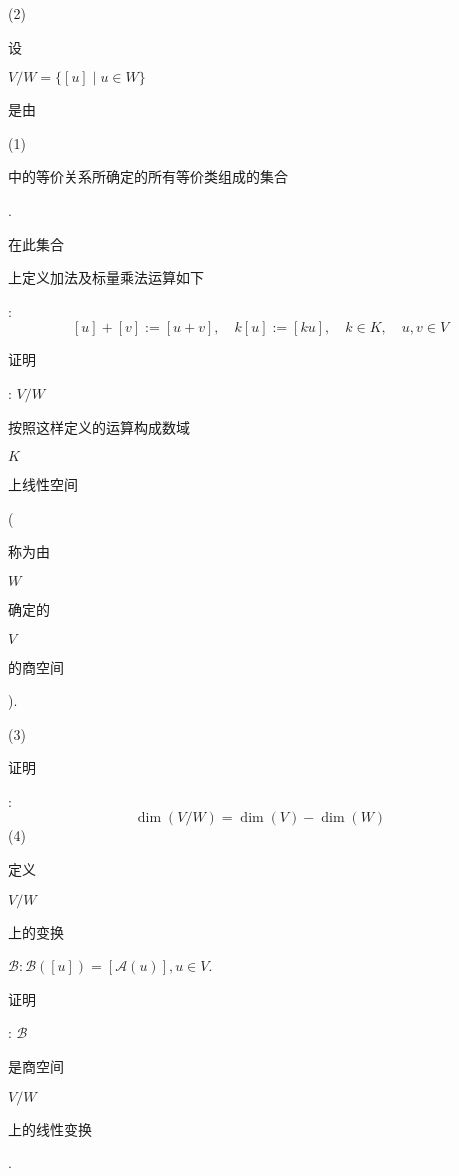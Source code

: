 \documentclass[10pt]{article}
\begin{document}
(2) \begin{CJK}{UTF8}{mj}设\end{CJK} $V / W=\{[u] \mid u \in W\}$ \begin{CJK}{UTF8}{mj}是由\end{CJK} (1) \begin{CJK}{UTF8}{mj}中的等价关系所确定的所有等价类组成的集合\end{CJK}. \begin{CJK}{UTF8}{mj}在此集合\end{CJK} \begin{CJK}{UTF8}{mj}上定义加法及标量乘法运算如下\end{CJK}:
$$
[u]+[v]:=[u+v], \quad k[u]:=[k u], \quad k \in K, \quad u, v \in V
$$
\begin{CJK}{UTF8}{mj}证明\end{CJK}: $V / W$ \begin{CJK}{UTF8}{mj}按照这样定义的运算构成数域\end{CJK} $K$ \begin{CJK}{UTF8}{mj}上线性空间\end{CJK} (\begin{CJK}{UTF8}{mj}称为由\end{CJK} $W$ \begin{CJK}{UTF8}{mj}确定的\end{CJK} $V$ \begin{CJK}{UTF8}{mj}的商空间\end{CJK}).

(3) \begin{CJK}{UTF8}{mj}证明\end{CJK}:
$$
\operatorname{dim}(V / W)=\operatorname{dim}(V)-\operatorname{dim}(W)
$$
(4) \begin{CJK}{UTF8}{mj}定义\end{CJK} $V / W$ \begin{CJK}{UTF8}{mj}上的变换\end{CJK} $\mathscr{B}: \mathscr{B}([u])=[\mathscr{A}(u)], u \in V$. \begin{CJK}{UTF8}{mj}证明\end{CJK}: $\mathscr{B}$ \begin{CJK}{UTF8}{mj}是商空间\end{CJK} $V / W$ \begin{CJK}{UTF8}{mj}上的线性变换\end{CJK}.
\end{document}
